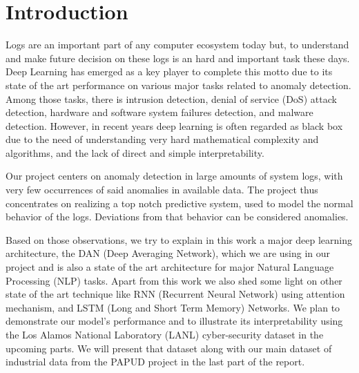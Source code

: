 \chapter*{Introduction}

Logs are an important part of any computer ecosystem today but, to understand and make future decision on these logs is an hard and important task these days.
Deep Learning has emerged as a key player to complete this motto due to its state of the art performance on various major tasks related to anomaly detection. Among those tasks, there is intrusion detection, denial of service (DoS) attack detection, hardware and software system failures detection, and malware detection. However, in recent years deep learning is often regarded as black box due to the need of understanding very hard mathematical complexity and algorithms, and the lack of direct and simple interpretability.

Our project centers on anomaly detection in large amounts of system logs, with very few occurrences of said anomalies in available data. The project thus concentrates on realizing a top notch predictive system, used to model the normal behavior of the logs. Deviations from that behavior can be considered anomalies.

Based on those observations, we try to explain in this work a major deep learning architecture, the DAN (Deep Averaging Network), which we are using in our project and is also a state of the art architecture for major Natural Language Processing (NLP) tasks.
Apart from this work we also shed some light on other state of the art technique like RNN (Recurrent Neural Network) using attention mechanism, and LSTM (Long and Short Term Memory) Networks.
We plan to demonstrate our model’s performance and to illustrate its interpretability using the Los Alamos National Laboratory (LANL) cyber-security dataset in the upcoming parts. We will present that dataset along with our main dataset of industrial data from the PAPUD project in the last part of the report.

